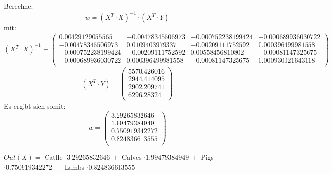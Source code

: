 \documentclass[a4paper,11pt,twoside]{scrartcl}
\begin{document}
\newline
\newline
\newline
Berechne:
\[w = (X^T \cdot X)^{-1} \cdot (X^T \cdot Y)\]
mit:\\
\[(X^T \cdot X)^{-1} = \begin{pmatrix}
0.00429129055565 & -0.00478345506973 & -0.000752238199424 & -0.000689936030722 \\
-0.00478345506973 & 0.0109403979337 & -0.00209111752592 & 0.000396499981558 \\
-0.000752238199424 & -0.00209111752592 & 0.00558456810802 & -0.00081147325675 \\
-0.000689936030722 & 0.000396499981558 & -0.00081147325675 & 0.000930021643118 \\
\end{pmatrix}\]
\newline
\newline
\[(X^T \cdot Y) = \begin{pmatrix}
5570.426016 \\
2944.414095 \\
2902.209741 \\
6296.28324 \\
\end{pmatrix}\]
\newline
\newline
\newline
Es ergibt sich somit:
\[w = \begin{pmatrix}
3.29265832646 \\
1.99479384949 \\
0.750919342272 \\
0.824836613555 \\
\end{pmatrix}\]
\newline
\newline

$Out(X) =$ Catlle $\cdot 3.29265832646~+$ Calves $\cdot 1.99479384949~+$ Pigs $\cdot 0.750919342272~+$ Lambs $\cdot 0.824836613555$
\end{document}
